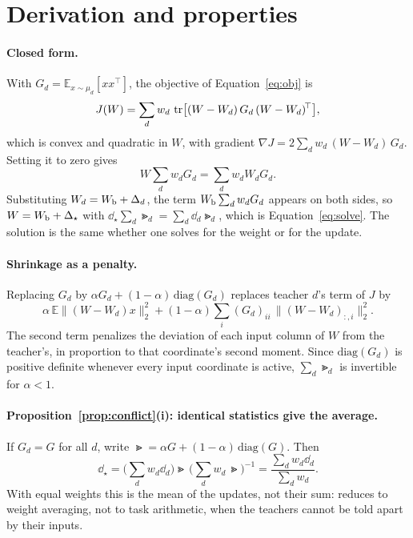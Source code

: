 \raggedbottom

\section{Derivation and properties}
\label{app:derivation}

\paragraph{Closed form.} With $G_d=\mathbb{E}_{x\sim\mu_d}[xx^{\!\top}]$, the
objective of Equation~\eqref{eq:obj} is
\begin{equation*}
J(W)=\sum_d w_d\,\operatorname{tr}\!\big[(W-W_d)\,G_d\,(W-W_d)^{\!\top}\big],
\end{equation*}
which is convex and quadratic in $W$, with gradient
$\nabla J=2\sum_d w_d\,(W-W_d)\,G_d$. Setting it to zero gives
\begin{equation*}
W\sum_d w_dG_d=\sum_d w_dW_dG_d .
\end{equation*}
Substituting $W_d=W_{\mathrm{b}}+\Delta_d$, the term $W_{\mathrm{b}}\sum_dw_dG_d$ appears on both
sides, so $W=W_{\mathrm{b}}+\Delta_\star$ with $\dd_\star\sum_d\Gt_d=\sum_d\dd_d\Gt_d$, which
is Equation~\eqref{eq:solve}. The solution is the same whether one solves for
the weight or for the update.

\paragraph{Shrinkage as a penalty.} Replacing $G_d$ by
$\alpha G_d+(1-\alpha)\,\mathrm{diag}(G_d)$ replaces teacher $d$'s term of $J$
by
\begin{equation*}
\alpha\,\mathbb{E}\big\|(W-W_d)x\big\|_2^2
+(1-\alpha)\sum_i(G_d)_{ii}\,\big\|(W-W_d)_{:,i}\big\|_2^2 .
\end{equation*}
The second term penalizes the deviation of each input column of $W$ from the
teacher's, in proportion to that coordinate's second moment. Since
$\mathrm{diag}(G_d)$ is positive definite whenever every input coordinate is
active, $\sum_d\Gt_d$ is invertible for $\alpha<1$.

\paragraph{Proposition~\ref{prop:conflict}(i): identical statistics give the
average.} If $G_d=G$ for all $d$, write
$\Gt=\alpha G+(1-\alpha)\,\mathrm{diag}(G)$. Then
\begin{equation*}
\dd_\star=\Big(\sum_dw_d\dd_d\Big)\Gt\,\Big(\sum_dw_d\,\Gt\Big)^{-1}
=\frac{\sum_dw_d\dd_d}{\sum_dw_d}.
\end{equation*}
With equal weights this is the mean of the updates, not their sum: \method
reduces to weight averaging, not to task arithmetic, when the teachers cannot
be told apart by their inputs.

